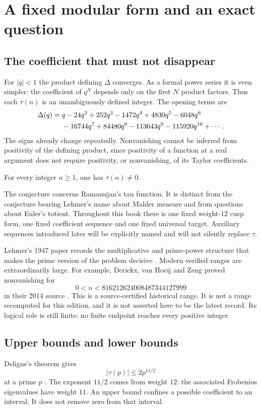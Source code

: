 \chapter{A fixed modular form and an exact question}\label{ch:target}
\section{The coefficient that must not disappear}
For $|q|<1$ the product defining $\Delta$ converges. As a formal power series it is even simpler: the coefficient of $q^N$ depends only on the first $N$ product factors. Thus each $\tau(n)$ is an unambiguously defined integer. The opening terms are
\begin{align}
\Delta(q)={}&q-24q^2+252q^3-1472q^4+4830q^5-6048q^6\notag\\
&-16744q^7+84480q^8-113643q^9-115920q^{10}+\cdots.
\end{align}
The signs already change repeatedly. Nonvanishing cannot be inferred from positivity of the defining product, since positivity of a function at a real argument does not require positivity, or nonvanishing, of its Taylor coefficients.

\begin{conjecture}[Lehmer]
For every integer $n\ge1$, one has $\tau(n)\ne0$.
\end{conjecture}

The conjecture concerns Ramanujan's tau function. It is distinct from the conjecture bearing Lehmer's name about Mahler measure and from questions about Euler's totient. Throughout this book there is one fixed weight-$12$ cusp form, one fixed coefficient sequence and one fixed universal target. Auxiliary sequences introduced later will be explicitly named and will not silently replace $\tau$.

Lehmer's 1947 paper records the multiplicative and prime-power structure that makes the prime version of the problem decisive \cite{Lehmer}. Modern verified ranges are extraordinarily large. For example, Derickx, van Hoeij and Zeng proved nonvanishing for
\[
0<n<816212624008487344127999
\]
in their 2014 source \cite{DHZ}. This is a source-certified historical range. It is not a range recomputed for this edition, and it is not asserted here to be the latest record. Its logical role is still finite: no finite endpoint reaches every positive integer.

\section{Upper bounds and lower bounds}
Deligne's theorem gives
\begin{equation}\label{eq:deligne}
|\tau(p)|\le2p^{11/2}
\end{equation}
at a prime $p$ \cite{DeligneWeil}. The exponent $11/2$ comes from weight $12$: the associated Frobenius eigenvalues have weight $11$. An upper bound confines a possible coefficient to an interval. It does not remove zero from that interval.

